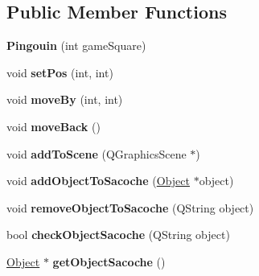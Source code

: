 \subsection*{Public Member Functions}
\begin{DoxyCompactItemize}
\item 
\hypertarget{class_pingouin_ab12d96478acd217073c566c5785facd5}{}{\bfseries Pingouin} (int game\+Square)\label{class_pingouin_ab12d96478acd217073c566c5785facd5}

\item 
\hypertarget{class_pingouin_a91f0120d2ee61c6a6ca715a8e88f3d3b}{}void {\bfseries set\+Pos} (int, int)\label{class_pingouin_a91f0120d2ee61c6a6ca715a8e88f3d3b}

\item 
\hypertarget{class_pingouin_a80aa8b486de1bba6c637a8ab0233fc10}{}void {\bfseries move\+By} (int, int)\label{class_pingouin_a80aa8b486de1bba6c637a8ab0233fc10}

\item 
\hypertarget{class_pingouin_a6b74f3acac4cce611992586356805d4a}{}void {\bfseries move\+Back} ()\label{class_pingouin_a6b74f3acac4cce611992586356805d4a}

\item 
\hypertarget{class_pingouin_a90eef5bc5b47bdae1508f572d1d898d5}{}void {\bfseries add\+To\+Scene} (Q\+Graphics\+Scene $\ast$)\label{class_pingouin_a90eef5bc5b47bdae1508f572d1d898d5}

\item 
\hypertarget{class_pingouin_ad91b21a996f75e32a78c203eb7490446}{}void {\bfseries add\+Object\+To\+Sacoche} (\hyperlink{class_object}{Object} $\ast$object)\label{class_pingouin_ad91b21a996f75e32a78c203eb7490446}

\item 
\hypertarget{class_pingouin_af2210d1930d4366e3e509210f756bceb}{}void {\bfseries remove\+Object\+To\+Sacoche} (Q\+String object)\label{class_pingouin_af2210d1930d4366e3e509210f756bceb}

\item 
\hypertarget{class_pingouin_ab284ad635cf9038f979577c81f29cdad}{}bool {\bfseries check\+Object\+Sacoche} (Q\+String object)\label{class_pingouin_ab284ad635cf9038f979577c81f29cdad}

\item 
\hypertarget{class_pingouin_aea4eb963e4e1a21b11f5b3eebf3c8863}{}\hyperlink{class_object}{Object} $\ast$ {\bfseries get\+Object\+Sacoche} ()\label{class_pingouin_aea4eb963e4e1a21b11f5b3eebf3c8863}


\end{DoxyCompactItemize}

